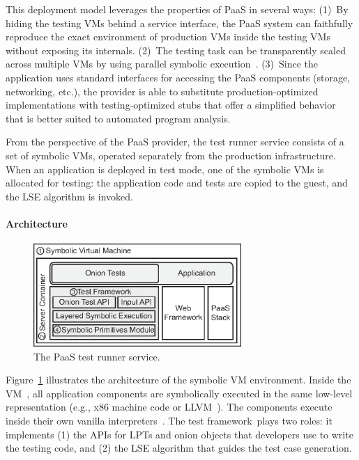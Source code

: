This deployment model leverages the properties of PaaS in several
ways:
%
(1)~By hiding the testing VMs behind a service interface, the PaaS system can faithfully reproduce the exact environment of production VMs inside the testing VMs without exposing its internals.
%
(2)~The testing task can be transparently scaled across multiple VMs
by using parallel symbolic execution~\cite{cloud9}.
%
(3)~Since the application uses standard interfaces for accessing the PaaS components (storage, networking, etc.), the provider is able to substitute production-optimized implementations with testing-optimized stubs that offer a simplified behavior that is better suited to automated program analysis.

From the perspective of the PaaS provider, the test runner service consists of a set of symbolic VMs, operated separately from the production infrastructure.  When an application is deployed in test mode, one of the symbolic VMs is allocated for testing: the application code and tests are copied to the guest, and the LSE algorithm is invoked.

\paragraph{Architecture}

\begin{figure}
  \centering
  \includegraphics[width=3.1in]{figures/paas/symbolic-vm}
  \caption{The PaaS test runner service.}
  \label{fig:fse}
\end{figure}

Figure~\ref{fig:fse} illustrates the architecture of the symbolic VM
environment.  Inside the VM~\cI, all application components are
symbolically executed in the same low-level representation (e.g., x86
machine code or LLVM~\cite{llvm}).  The components execute inside
their own vanilla interpreters~\cII.  
%
The test framework~\cIII plays two roles: it implements (1) the APIs for LPTs and onion objects that developers use to write the testing code, and (2) the LSE algorithm that guides the test case generation.

